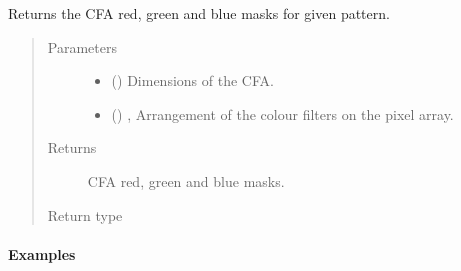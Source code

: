 \documentclass[letterpaper,10pt,english]{sphinxmanual}
\begin{document}
\begin{fulllineitems}
\label{\detokenize{generated/colour_demosaicing.masks_CFA_Bayer:colour_demosaicing.masks_CFA_Bayer}}
Returns the  CFA red, green and blue masks for given pattern.
\begin{quote}\begin{description}
\item[{Parameters}] \leavevmode\begin{itemize}
\item {} 
 () \textendash{} Dimensions of the  CFA.

\item {} 
 (\sphinxstyleliteralemphasis{, }) \textendash{} ,
Arrangement of the colour filters on the pixel array.

\end{itemize}

\item[{Returns}] \leavevmode
{} CFA red, green and blue masks.

\item[{Return type}] \leavevmode
{}

\end{description}\end{quote}
\paragraph{Examples}


\end{fulllineitems}
\end{document}
